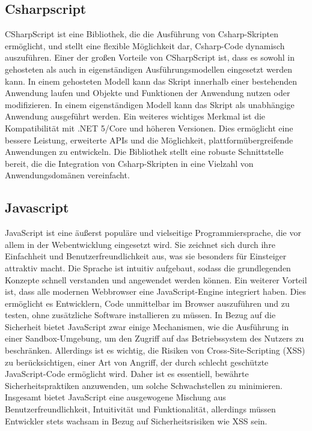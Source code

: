 \newpage
\subsection{Csharpscript}
CSharpScript ist eine Bibliothek, die die Ausführung von Csharp-Skripten ermöglicht, und stellt eine flexible Möglichkeit dar, Csharp-Code dynamisch auszuführen. 
Einer der großen Vorteile von CSharpScript ist, dass es sowohl in gehosteten als auch in eigenständigen Ausführungsmodellen eingesetzt werden kann. 
In einem gehosteten Modell kann das Skript innerhalb einer bestehenden Anwendung laufen und Objekte und Funktionen der Anwendung nutzen oder modifizieren. 
In einem eigenständigen Modell kann das Skript als unabhängige Anwendung ausgeführt werden. 
Ein weiteres wichtiges Merkmal ist die Kompatibilität mit .NET 5/Core und höheren Versionen. 
Dies ermöglicht eine bessere Leistung, erweiterte APIs und die Möglichkeit, plattformübergreifende Anwendungen zu entwickeln. 
Die Bibliothek stellt eine robuste Schnittstelle bereit, die die Integration von Csharp-Skripten in eine Vielzahl von Anwendungsdomänen vereinfacht.


\newpage 
\subsection{Javascript}
JavaScript ist eine äußerst populäre und vielseitige Programmiersprache, die vor allem in der Webentwicklung eingesetzt wird. 
Sie zeichnet sich durch ihre Einfachheit und Benutzerfreundlichkeit aus, was sie besonders für Einsteiger attraktiv macht. 
Die Sprache ist intuitiv aufgebaut, sodass die grundlegenden Konzepte schnell verstanden und angewendet werden können. 
Ein weiterer Vorteil ist, dass alle modernen Webbrowser eine JavaScript-Engine integriert haben. 
Dies ermöglicht es Entwicklern, Code unmittelbar im Browser auszuführen und zu testen, ohne zusätzliche Software installieren zu müssen. 
In Bezug auf die Sicherheit bietet JavaScript zwar einige Mechanismen, wie die Ausführung in einer Sandbox-Umgebung, um den Zugriff auf das Betriebssystem des Nutzers zu beschränken. 
Allerdings ist es wichtig, die Risiken von Cross-Site-Scripting (XSS) zu berücksichtigen, einer Art von Angriff, der durch schlecht geschützte JavaScript-Code ermöglicht wird. 
Daher ist es essentiell, bewährte Sicherheitspraktiken anzuwenden, um solche Schwachstellen zu minimieren. 
Insgesamt bietet JavaScript eine ausgewogene Mischung aus Benutzerfreundlichkeit, Intuitivität und Funktionalität, allerdings müssen Entwickler stets wachsam in Bezug auf Sicherheitsrisiken wie XSS sein.

